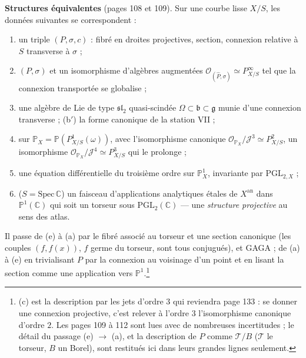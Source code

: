 \documentclass[11pt,a4paper]{article}
\begin{document}
\textbf{Structures équivalentes} (pages 108 et 109). Sur une courbe lisse
$X/S$, les données suivantes se correspondent :
\begin{enumerate}
  \item[(a)] un triple $(P, \sigma, c)$ : fibré en droites projectives, section,
  connexion relative à $S$ transverse à $\sigma$ ;
  \item[(a$'$)] $(P, \sigma)$ et un isomorphisme d'algèbres augmentées
  $\mathcal{O}_{(\hat P, \sigma)} \simeq P^\infty_{X/S}$ tel que la connexion
  transportée se globalise ;
  \item[(b)] une algèbre de Lie de type $\mathfrak{sl}_2$ quasi-scindée
  $\Omega \subset \mathfrak{b} \subset \mathfrak{g}$ munie d'une connexion transverse ;
  (b$'$) la forme canonique de la station VII ;
  \item[(c)] sur $\mathbb{P}_X = \mathbb{P}(P^1_{X/S}(\omega))$, avec l'isomorphisme
  canonique $\mathcal{O}_{\mathbb{P}_X}/\mathcal{J}^3 \simeq P^2_{X/S}$, un
  isomorphisme $\mathcal{O}_{\mathbb{P}_X}/\mathcal{J}^4 \simeq P^3_{X/S}$ qui le
  prolonge ;
  \item[(d)] une équation différentielle du troisième ordre sur
  $\mathbb{P}^1_X$, invariante par $\mathrm{PGL}_{2,X}$ ;
  \item[(e)] ($S = \mathrm{Spec}\,\mathbb{C}$) un faisceau d'applications
  analytiques étales de $X^{\mathrm{an}}$ dans $\mathbb{P}^1(\mathbb{C})$ qui soit un
  torseur sous $\mathrm{PGL}_2(\mathbb{C})$ — une \emph{structure projective} au
  sens des atlas.
\end{enumerate}
Il passe de (e) à (a) par le fibré associé au torseur et une section
canonique (les couples $(f, f(x))$, $f$ germe du torseur, sont tous
conjugués), et GAGA ; de (a) à (e) en trivialisant $P$ par la connexion au
voisinage d'un point et en lisant la section comme une application vers
$\mathbb{P}^1$.\footnote{(c) est la description par les jets d'ordre $3$ qui
reviendra page 133 : se donner une connexion projective, c'est relever à
l'ordre $3$ l'isomorphisme canonique d'ordre $2$. Les pages 109 à 112 sont
lues avec de nombreuses incertitudes ; le détail du passage (e) $\to$ (a), et
la description de $P$ comme $\mathcal{T}/B$ ($\mathcal{T}$ le torseur, $B$ un
Borel), sont restitués ici dans leurs grandes lignes seulement.}
\end{document}
